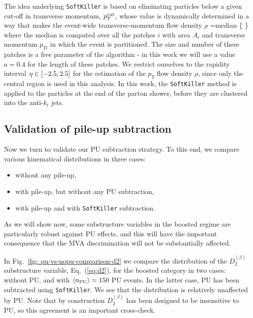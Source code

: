 The idea underlying {\tt SoftKiller} is based on eliminating particles
below a given cut-off in transverse momentum, $p_T^{\rm cut}$, whose
value is dynamically determined in a way that makes the event-wide
transverse-momentum flow density $\rho$
\be
\rho={\rm median} \Bigg\{ \Bigg\}
\ee
where the median is computed over all the patches $i$ with area
$A_i$ and transverse momentum $p_{Ti}$ in which the event is partitioned.
%
The size and number of these patches is a free parameter of the algorithm -
in this work we will use a value $a=0.4$ for the length of these
patches.
%
We restrict ourselves to the rapidity interval
$\eta \in \left[ -2.5, 2.5\right]$ for the estimation of the
$p_T$ flow density $\rho$, since only the central region
is used in this analysis.
%
In this work, the {\tt SoftKiller} method is applied
to the particles at the end of the parton shower, before
they are clustered into the anti-$k_t$ jets.


\subsection{Validation of pile-up subtraction}

Now we turn to validate our PU subtraction strategy.
%
To this end, we compare various kinematical distributions in three
cases:
\begin{itemize}
\item without any pile-up,
\item with pile-up, but without any PU subtraction,
  \item with pile-up and with {\tt SoftKiller} subtraction.
\end{itemize}
As we will show now, some substructure variables in the boosted
regime are particularly robust against PU effects, and this
will have the important consequence that the MVA discrimination
will not be substantially affected.


In Fig.~\ref{fig: pu-vs-nopu-comparison-d2} we
compare the distribution of the $D_2^{(\beta)}$
    substructure variable, Eq.~(\ref{eq:d2}), for the
    boosted category in two cases: without PU, and
    with $\left\langle n_{\rm PU}\right\rangle=150$ PU events.
    In the latter case, PU has been subtracted using
    {\tt SoftKiller}.
    We see that the distribution is relatively unaffected by PU.
    Note that by construction $D_2^{(\beta)}$ has been designed
    to be insensitive to PU, so this agreement is an important
    cross-check.

